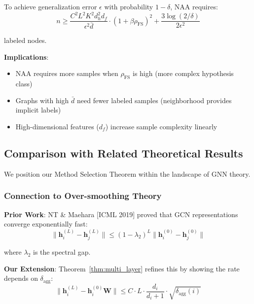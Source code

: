 \begin{corollary}
\label{cor:sample_complexity}
To achieve generalization error $\epsilon$ with probability $1-\delta$, NAA requires:
\begin{equation}
n \geq \frac{C^2 L^2 K^2 d_h^2 d_f}{\epsilon^2 \bar{d}} \cdot (1 + \beta \rho_{\text{FS}})^2 + \frac{3\log(2/\delta)}{2\epsilon^2}
\end{equation}

labeled nodes.
\end{corollary}

\textbf{Implications}:
\begin{itemize}
\item NAA requires more samples when $\rho_{\text{FS}}$ is high (more complex hypothesis class)
\item Graphs with high $\bar{d}$ need fewer labeled samples (neighborhood provides implicit labels)
\item High-dimensional features ($d_f$) increase sample complexity linearly
\end{itemize}

\subsection{Comparison with Related Theoretical Results}

We position our Method Selection Theorem within the landscape of GNN theory.

\subsubsection{Connection to Over-smoothing Theory}

\textbf{Prior Work}: NT \& Maehara [ICML 2019] proved that GCN representations converge exponentially fast:
\begin{equation}
\|\mathbf{h}_i^{(L)} - \mathbf{h}_j^{(L)}\| \leq (1-\lambda_2)^L \|\mathbf{h}_i^{(0)} - \mathbf{h}_j^{(0)}\|
\end{equation}

where $\lambda_2$ is the spectral gap.

\textbf{Our Extension}: Theorem~\ref{thm:multi_layer} refines this by showing the rate depends on $\delta_{\text{agg}}$:
\begin{equation}
\|\mathbf{h}_i^{(L)} - \mathbf{h}_i^{(0)}\mathbf{W}\| \leq C \cdot L \cdot \frac{d_i}{d_i+1} \cdot \sqrt{\delta_{\text{agg}}(i)}
\end{equation}

